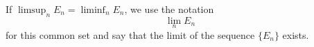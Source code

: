 If $\limsup_n E_n = \liminf_n E_n$, we use the notation
$$\lim_n E_n$$
for this common set and say that the limit of the sequence $\{E_n\}$ exists.
